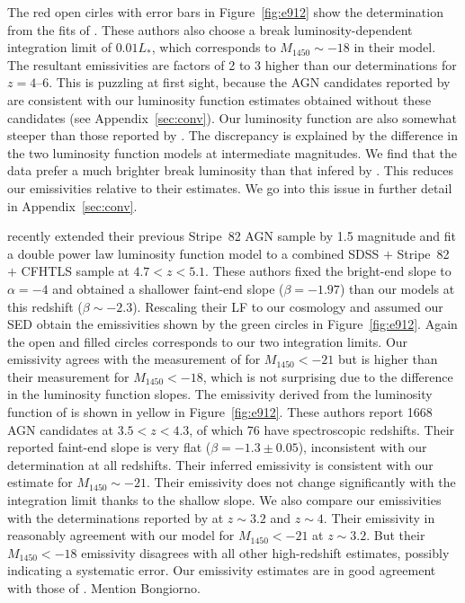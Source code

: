 \documentclass[a4paper,fleqn,usenatbib]{mnras}
\begin{document}
The red open cirles with error bars in Figure~\ref{fig:e912} show the
determination from the fits of \citet{2015AA...578A..83G}.  These
authors also choose a break luminosity-dependent integration limit of
$0.01L_*$, which corresponds to $M_{1450}\sim -18$ in their model.
The resultant emissivities are factors of 2 to 3 higher than our
determinations for $z=4$--$6$.  This is puzzling at first sight,
because the AGN candidates reported by \citet{2015AA...578A..83G} are
consistent with our luminosity function estimates obtained without
these candidates (see Appendix~\ref{sec:conv}).  Our luminosity
function are also somewhat steeper than those reported by
\citet{2015AA...578A..83G}.  The discrepancy is explained by the
difference in the two luminosity function models at intermediate
magnitudes.  We find that the data prefer a much brighter break
luminosity than that infered by \citet{2015AA...578A..83G}.  This
reduces our emissivities relative to their estimates.  We go into this
issue in further detail in Appendix~\ref{sec:conv}.

\citet{2018AJ....155..131M} recently extended their previous Stripe~82
AGN sample by 1.5 magnitude and fit a double power law luminosity
function model to a combined SDSS $+$ Stripe~82 $+$ CFHTLS sample at
$4.7 < z < 5.1$.  These authors fixed the bright-end slope to
$\alpha=-4$ and obtained a shallower faint-end slope ($\beta=-1.97$)
than our models at this redshift ($\beta\sim -2.3$).  Rescaling their
LF to our cosmology and assumed our SED obtain the emissivities shown
by the green circles in Figure~\ref{fig:e912}.  Again the open and
filled circles corresponds to our two integration limits.  Our
emissivity agrees with the measurement of \citet{2018AJ....155..131M}
for $M_{1450}<-21$ but is higher than their measurement for
$M_{1450}<-18$, which is not surprising due to the difference in the
luminosity function slopes.  The emissivity derived from the
luminosity function of \citet{2018PASJ...70S..34A} is shown in yellow
in Figure~\ref{fig:e912}.  These authors report 1668 AGN candidates at
$3.5<z<4.3$, of which 76 have spectroscopic redshifts.  Their reported
faint-end slope is very flat ($\beta=-1.3\pm 0.05$), inconsistent with
our determination at all redshifts.  Their inferred emissivity is
consistent with our estimate for $M_{1450}\sim -21$.  Their emissivity
does not change significantly with the integration limit thanks to the
shallow slope.  We also compare our emissivities with the
determinations reported by \citet{2012ApJ...755..169M} at $z\sim 3.2$
and $z\sim 4$.  Their emissivity in reasonably agreement with our
model for $M_{1450}<-21$ at $z\sim 3.2$.  But their $M_{1450}<-18$
emissivity disagrees with all other high-redshift estimates, possibly
indicating a systematic error.  Our emissivity estimates are in good
agreement with those of \citet{2018MNRAS.474.2904P}.  Mention
Bongiorno.
\end{document}
